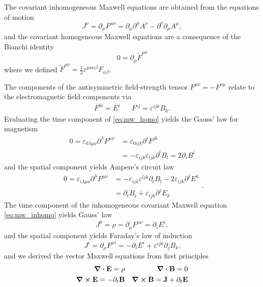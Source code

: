 The covariant inhomogeneous Maxwell equations are obtained from the equations of motion
\begin{equation}
	J^\nu
	=
	\partial_\mu F^{\mu\nu}
	=
	\partial_\mu\partial^\mu A^\nu
	-
	\partial^\nu\partial_\mu A^\mu
	\label{eq:mw_inhomo},
\end{equation}
and the covariant homogeneous Maxwell equations are a consequence of the Bianchi identity
\begin{equation}
	0
	=
	\partial_\mu\tilde{F}^{\mu\nu}
	\label{eq:mw_homo}
\end{equation}
where we defined $\tilde{F}^{\mu\nu}=\frac{1}{2}\varepsilon^{\mu\nu\alpha\beta}F_{\alpha\beta}$.

The components of the antisymmetric field-strength tensor $F^{\mu\nu}=-F^{\nu\mu}$ relate to the electromagnetic field components via~\cite[p.~336]{Srednicki2007}
\begin{align}
	F^{0i}
	=
	E^i
	&&
	F^{ij}
	=
	\varepsilon^{ijk}B_k
	\label{eq:mw_field_strength_components}.
\end{align}
Evaluating the time component of \cref{eq:mw_homo} yields the Gauss' law for magnetism
\begin{equation}
	\begin{split}
		0
		=
		\varepsilon_{0\lambda\mu\nu}\partial^\lambda F^{\mu\nu}
		&=
		\varepsilon_{0ijk}\partial^iF^{jk}
		\\
		&=
		-
		\varepsilon_{ijk}\varepsilon_{ljk}
		\partial^i B_l
		=
		2\partial_iB^i
	\end{split}
	\label{eq:mw_gauss_law_mag}
\end{equation}
and the spatial component yields Ampere's circuit law
\begin{equation}
	\begin{split}
		0
		=
		\varepsilon_{i\lambda\mu\nu}
		\partial^\lambda
		F^{\mu\nu}
		&=
		-
		\varepsilon_{ijk}
		\varepsilon^{ljk}
		\partial_t B_l
		-
		2\varepsilon_{ijk}
		\partial^jE^k
		\\
		&=
		\partial_tB_i
		+
		\varepsilon_{ijk}
		\partial^jE_k
	\end{split}
	\label{eq:mw_ampere_law}.
\end{equation}
The time component of the inhomogeneous covariant Maxwell equation \cref{eq:mw_inhomo} yields Gauss' law
\begin{equation}
	J^0
	=
	\rho
	=
	\partial_\mu F^{\mu\nu}
	=
	\partial_i E^i
	\label{eq:mw_gauss_law},
\end{equation}
and the spatial component yields Faraday's law of induction
\begin{equation}
	J^i
	=
	\partial_\mu F^{\mu i}
	=
	-\partial_t E^i
	+\varepsilon^{ijk}\partial_j B_k
	\label{eq:mw_faraday_law}.
\end{equation}
and we derived the vector Maxwell equations from first principles
\begin{align}
	\div\vb{E}
	=
	\rho
	&&
	\div\vb{B}
	=
	0
	\label{eq:mw_homo_vec}
	\\
	\curl\vb{E}
	=
	-
	\partial_t\vb{B}
	&&
	\curl\vb{B}
	=
	\vb{J}
	+
	\partial_t\vb{E}
	\label{eq:mw_inhomo_vec}
\end{align}

